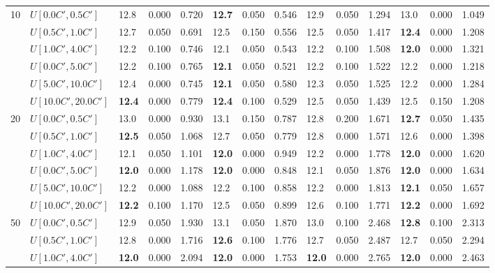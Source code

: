 \begin{table}[h]
{\begin{tabular}{|l|l||l|l|l||l|l|l||l|l|l||l|l|l|}
      \hline\hline
      \multirow{6}{*}{10} & $U[0.0C',0.5C']$ & 12.8 & 0.000 & 0.720 & \textbf{12.7} & 0.050 & 0.546 & 12.9 & 0.050 & 1.294 & 13.0 & 0.000 & 1.049 \\
       & $U[0.5C',1.0C']$ & 12.7 & 0.050 & 0.691 & 12.5 & 0.150 & 0.556 & 12.5 & 0.050 & 1.417 & \textbf{12.4} & 0.000 & 1.208 \\
       & $U[1.0C',4.0C']$ & 12.2 & 0.100 & 0.746 & 12.1 & 0.050 & 0.543 & 12.2 & 0.100 & 1.508 & \textbf{12.0} & 0.000 & 1.321 \\
       & $U[0.0C',5.0C']$ & 12.2 & 0.100 & 0.765 & \textbf{12.1} & 0.050 & 0.521 & 12.2 & 0.100 & 1.522 & 12.2 & 0.000 & 1.218 \\
       & $U[5.0C',10.0C']$ & 12.4 & 0.000 & 0.745 & \textbf{12.1} & 0.050 & 0.580 & 12.3 & 0.050 & 1.525 & 12.2 & 0.000 & 1.284 \\
       & $U[10.0C',20.0C']$ & \textbf{12.4} & 0.000 & 0.779 & \textbf{12.4} & 0.100 & 0.529 & 12.5 & 0.050 & 1.439 & 12.5 & 0.150 & 1.208 \\
      \hline\hline
      \multirow{6}{*}{20} & $U[0.0C',0.5C']$ & 13.0 & 0.000 & 0.930 & 13.1 & 0.150 & 0.787 & 12.8 & 0.200 & 1.671 & \textbf{12.7} & 0.050 & 1.435 \\
       & $U[0.5C',1.0C']$ & \textbf{12.5} & 0.050 & 1.068 & 12.7 & 0.050 & 0.779 & 12.8 & 0.000 & 1.571 & 12.6 & 0.000 & 1.398 \\
       & $U[1.0C',4.0C']$ & 12.1 & 0.050 & 1.101 & \textbf{12.0} & 0.000 & 0.949 & 12.2 & 0.000 & 1.778 & \textbf{12.0} & 0.000 & 1.620 \\
       & $U[0.0C',5.0C']$ & \textbf{12.0} & 0.000 & 1.178 & \textbf{12.0} & 0.000 & 0.848 & 12.1 & 0.050 & 1.876 & \textbf{12.0} & 0.000 & 1.634 \\
       & $U[5.0C',10.0C']$ & 12.2 & 0.000 & 1.088 & 12.2 & 0.100 & 0.858 & 12.2 & 0.000 & 1.813 & \textbf{12.1} & 0.050 & 1.657 \\
       & $U[10.0C',20.0C']$ & \textbf{12.2} & 0.100 & 1.170 & 12.5 & 0.050 & 0.899 & 12.6 & 0.100 & 1.771 & \textbf{12.2} & 0.000 & 1.692 \\
      \hline\hline
      \multirow{6}{*}{50} & $U[0.0C',0.5C']$ & 12.9 & 0.050 & 1.930 & 13.1 & 0.050 & 1.870 & 13.0 & 0.100 & 2.468 & \textbf{12.8} & 0.100 & 2.313 \\
       & $U[0.5C',1.0C']$ & 12.8 & 0.000 & 1.716 & \textbf{12.6} & 0.100 & 1.776 & 12.7 & 0.050 & 2.487 & 12.7 & 0.050 & 2.294 \\
       & $U[1.0C',4.0C']$ & \textbf{12.0} & 0.000 & 2.094 & \textbf{12.0} & 0.000 & 1.753 & \textbf{12.0} & 0.000 & 2.765 & \textbf{12.0} & 0.000 & 2.463 \\

\end{tabular}}
\end{table}

